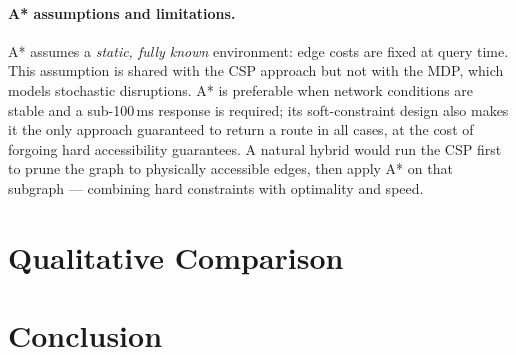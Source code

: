 \documentclass[letterpaper]{article} %
\begin{document}
\paragraph{A* assumptions and limitations.}
A* assumes a \emph{static, fully known} environment: edge costs are
fixed at query time. This assumption is shared with the CSP approach
but not with the MDP, which models
stochastic disruptions.
A* is preferable when network conditions are stable and a
sub-100\,ms response is required; its soft-constraint design
also makes it the only approach guaranteed to return a route
in all cases, at the cost of forgoing hard accessibility
guarantees.
A natural hybrid would run the CSP first to prune the graph
to physically accessible edges, then apply A* on that subgraph
— combining hard constraints with optimality and speed.

\section{Qualitative Comparison}


\section{Conclusion}


\end{document}
